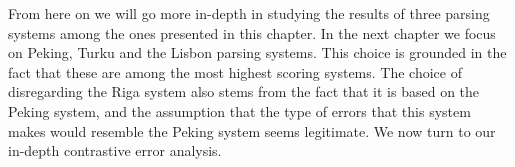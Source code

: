 From here on we will go more in-depth in studying the results of three parsing systems among the ones presented in this chapter. In the next chapter we focus on Peking, Turku and the Lisbon parsing systems. This choice is grounded in the fact that these are among the most highest scoring systems. The choice of disregarding the Riga system also stems from the fact that it is based on the Peking system, and the assumption that the type of errors that this system makes would resemble the Peking system seems legitimate. We now turn to our in-depth contrastive error analysis.